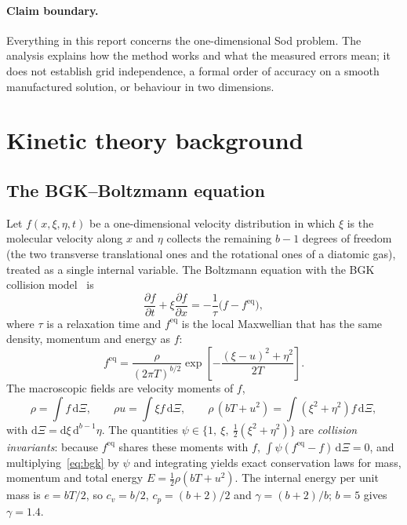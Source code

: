 \documentclass[11pt]{article}
\theoremstyle{remark}
\newcommand{\feq}{f^{\mathrm{eq}}}
\newcommand{\dd}{\mathrm{d}}
\newcommand{\pd}[2]{\frac{\partial #1}{\partial #2}}
\begin{document}
\paragraph{Claim boundary.}
Everything in this report concerns the one-dimensional Sod problem.  The analysis
explains how the method works and what the measured errors mean; it does not
establish grid independence, a formal order of accuracy on a smooth manufactured
solution, or behaviour in two dimensions.

\section{Kinetic theory background}
\label{sec:kinetic}

\subsection{The BGK--Boltzmann equation}

Let $f(x,\xi,\eta,t)$ be a one-dimensional velocity distribution in which $\xi$ is
the molecular velocity along $x$ and $\eta$ collects the remaining
$b-1$ degrees of freedom (the two transverse translational ones and the
rotational ones of a diatomic gas), treated as a single internal variable.  The
Boltzmann equation with the BGK collision model~\citep{BGK1954} is
\begin{equation}
  \pd{f}{t} + \xi\pd{f}{x} = -\frac{1}{\tau}\bigl(f - \feq\bigr),
  \label{eq:bgk}
\end{equation}
where $\tau$ is a relaxation time and $\feq$ is the local Maxwellian that has the
same density, momentum and energy as $f$:
\begin{equation}
  \feq = \frac{\rho}{(2\pi T)^{b/2}}
  \exp\!\left[-\frac{(\xi-u)^2 + \eta^2}{2T}\right].
\end{equation}
The macroscopic fields are velocity moments of $f$,
\begin{equation}
  \rho = \int f\,\dd\Xi,\qquad
  \rho u = \int \xi f\,\dd\Xi,\qquad
  \rho\,(bT + u^2) = \int (\xi^2 + \eta^2) f\,\dd\Xi,
  \label{eq:moments_cont}
\end{equation}
with $\dd\Xi = \dd\xi\,\dd^{b-1}\eta$.  The quantities $\psi \in \{1,\ \xi,\ \tfrac12(\xi^2+\eta^2)\}$
are \emph{collision invariants}: because $\feq$ shares these moments with $f$,
$\int \psi (\feq - f)\,\dd\Xi = 0$, and multiplying~\eqref{eq:bgk} by $\psi$ and
integrating yields exact conservation laws for mass, momentum and total energy
$E = \tfrac12\rho(bT+u^2)$.  The internal energy per unit mass is $e = bT/2$, so
$c_v = b/2$, $c_p = (b+2)/2$ and $\gamma = (b+2)/b$; $b=5$ gives $\gamma=1.4$.
\end{document}
